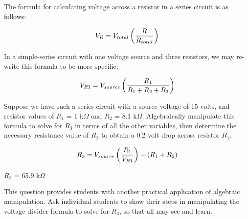 

The formula for calculating voltage across a resistor in a series circuit is as follows:

$$V_R = V_{total}\left(R \over R_{total}\right)$$

In a simple-series circuit with one voltage source and three resistors, we may re-write this formula to be more specific:

$$V_{R1} = V_{source}\left(R_1 \over {R_1 + R_2 + R_3}\right)$$

Suppose we have such a series circuit with a source voltage of 15 volts, and resistor values of $R_1$ = 1 k$\Omega$ and $R_2$ = 8.1 k$\Omega$.  Algebraically manipulate this formula to solve for $R_3$ in terms of all the other variables, then determine the necessary resistance value of $R_3$ to obtain a 0.2 volt drop across resistor $R_1$.







$$R_3 = V_{source}\left({R_1 \over V_{R1}}\right) - (R_1 + R_2)$$

$R_3$ = 65.9 k$\Omega$







This question provides students with another practical application of algebraic manipulation.  Ask individual students to show their steps in manipulating the voltage divider formula to solve for $R_3$, so that all may see and learn.




